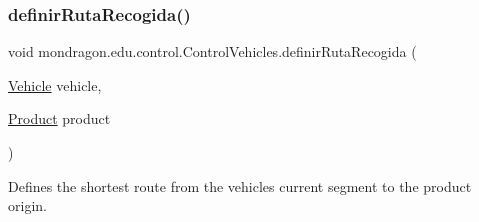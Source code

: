\subsubsection{\texorpdfstring{definirRutaRecogida()}{definirRutaRecogida()}}
{\footnotesize\ttfamily void mondragon.\+edu.\+control.\+Control\+Vehicles.\+definir\+Ruta\+Recogida (\begin{DoxyParamCaption}\item[{\mbox{\hyperlink{classmondragon_1_1edu_1_1clases_1_1_vehicle}{Vehicle}}}]{vehicle,  }\item[{\mbox{\hyperlink{classmondragon_1_1edu_1_1clases_1_1_product}{Product}}}]{product }\end{DoxyParamCaption})\hspace{0.3cm}{\ttfamily [inline]}}

Defines the shortest route from the vehicles current segment to the product origin.


